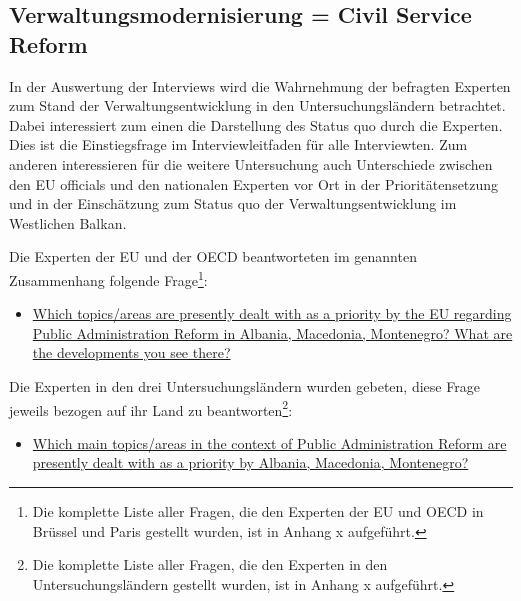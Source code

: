 \subsection{Verwaltungsmodernisierung = Civil Service Reform }
In der Auswertung der Interviews wird die Wahrnehmung der befragten Experten zum Stand der Verwaltungsentwicklung in den Untersuchungsländern betrachtet. Dabei interessiert zum einen die Darstellung des Status quo durch die Experten. Dies ist die Einstiegsfrage im Interviewleitfaden für alle Interviewten. Zum anderen interessieren für die weitere Untersuchung auch Unterschiede zwischen den EU officials und den nationalen Experten vor Ort in der Prioritätensetzung und in der Einschätzung zum Status quo der Verwaltungsentwicklung im Westlichen Balkan. 

Die Experten der EU und der OECD beantworteten im genannten Zusammenhang folgende Frage\footnote{Die komplette Liste aller Fragen, die den Experten der EU und OECD in Brüssel und Paris gestellt wurden, ist in Anhang x aufgeführt.}:
\begin{itemize}[label={}]
\item \ul{Which topics/areas are presently dealt with as a priority by the EU regarding Public Administration Reform in Albania, Macedonia, Montenegro? What are the developments you see there?}
\end{itemize}

Die Experten in den drei Untersuchungsländern wurden gebeten, diese Frage jeweils bezogen auf ihr Land zu beantworten\footnote{Die komplette Liste aller Fragen, die den Experten in den Untersuchungsländern gestellt wurden, ist in Anhang x aufgeführt.}:
\begin{itemize}[label={}]
\item \ul{Which main topics/areas in the context of Public Administration Reform are presently dealt with as a priority by Albania, Macedonia, Montenegro?}
\end{itemize}

